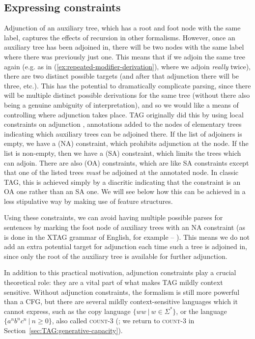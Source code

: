 \documentclass[output=paper,hidelinks]{langscibook}
\begin{document}

\subsection{Expressing constraints}\label{sec:TAG:contraints}

Adjunction of an auxiliary tree, which has a root and foot node with the same
label, captures the effects of recursion in other formalisms. However, once an
auxiliary tree has been adjoined in, there will be two nodes with the same label
where there was previously just one. This means that if we adjoin the same tree
again (e.g. as in (\ref{ex:repeated-modifier-derivation}), where we adjoin
\textit{really} twice), there are two distinct possible targets (and after that
adjunction there will be three, etc.). This has the potential to dramatically
complicate parsing, since there will be multiple distinct possible derivations
for the same tree (without there also being a genuine ambiguity of
interpretation), and so we would like a means of controlling where adjunction
takes place. TAG originally did this by using local constraints on adjunction
\citep[100ff.]{joshi1987}, annotations added to the nodes of elementary trees
indicating which auxiliary trees can be adjoined there. If the list of adjoiners
is empty, we have a  (NA) constraint, which prohibits
adjunction at the node. If the list is non-empty, then we have a  (SA) constraint, which limits the trees which can adjoin. There
are also  (OA) constraints, which are like SA
constraints except that one of the listed trees \emph{must} be adjoined at the
annotated node. In classic TAG, this is achieved simply by a diacritic
indicating that the constraint is an OA one rather than an SA one. We will see
below how this can be achieved in a less stipulative way by making use of
feature structures.

Using these constraints, we can avoid having multiple possible parses for
sentences by marking the foot node of auxiliary trees with an NA constraint (as
is done in the XTAG grammar of English, for example -- \citealp{xtag}). This
means we do not add an extra potential target for adjunction each time such a
tree is adjoined in, since only the root of the auxiliary tree is available for
further adjunction.

In addition to this practical motivation, adjunction constraints play a crucial
theoretical role: they are a vital part of what makes TAG mildly context
sensitive. Without adjunction constraints, the formalism is still more powerful
than a CFG, but there are several mildly context-sensitive languages which it
cannot express, such as the copy language $\{ww\ \vert\ w \in \Sigma^{*}\}$, or
the language $\{a^nb^nc^n\ \vert\ n \geq 0\}$, also called \textsc{count-3}
(\citealt[27, 58]{Kallmeyer2010}; we return to \textsc{count-3} in
Section~\ref{sec:TAG:generative-capacity}).
\end{document}
